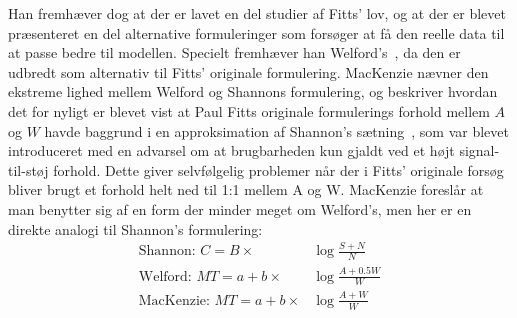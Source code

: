 Han fremhæver dog at der er lavet en del studier af Fitts' lov, og at der er blevet præsenteret en del alternative formuleringer som forsøger at få den reelle data til at passe bedre til modellen. Specielt fremhæver han Welford's~\cite{welford1960,welford1968}, da den er udbredt som alternativ til Fitts' originale formulering. MacKenzie nævner den ekstreme lighed mellem Welford og Shannons formulering, og beskriver hvordan det for nyligt er blevet vist at Paul Fitts originale formulerings forhold mellem $A$ og $W$ havde baggrund i en approksimation af Shannon's sætning~\cite[p. 388]{fitts1954}, som var blevet introduceret med en advarsel om at brugbarheden kun gjaldt ved et højt signal-til-støj forhold. Dette giver selvfølgelig problemer når der i Fitts' originale forsøg bliver brugt et forhold helt ned til 1:1 mellem A og W. MacKenzie foreslår at man benytter sig af en form der minder meget om Welford's, men her er en direkte analogi til Shannon's formulering:
\begin{align}
\text{Shannon: }C=B\times&\log{\frac{S+N}{N}}\\
\text{Welford: }MT=a+b\times&\log{\frac{A+0.5W}{W}}\\
\text{MacKenzie: }MT=a+b\times&\log{\frac{A+W}{W}}
\end{align}

